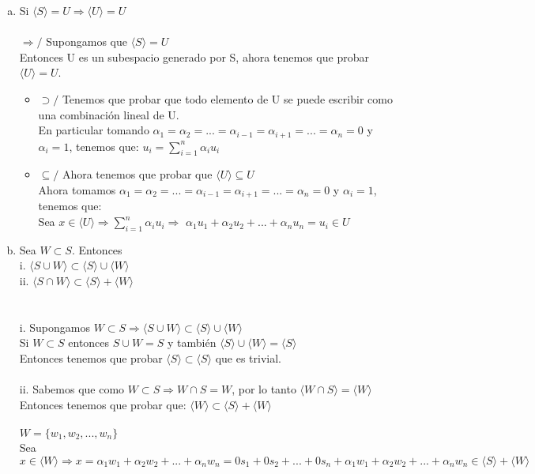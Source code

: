 \documentclass{article}
\begin{document}
\begin{enumerate}[a.]
	\item
		Si $\langle S\rangle = U \Longrightarrow \langle U\rangle = U$ \\ \\
		$\Rightarrow /$
		Supongamos que $\langle S \rangle = U$ \\
		Entonces U es un subespacio generado por S, ahora tenemos que probar $\langle U \rangle = U$.
		\begin{itemize}
			\item
				$\supset/$ Tenemos que probar que todo elemento de U se puede escribir como una
				combinación lineal de U. \\
				En particular tomando $\alpha_1 = \alpha_2 = ... = \alpha_{i-1} = \alpha_{i+1} = ...
				= \alpha_n = 0$ y $\alpha_i = 1$, tenemos que:
				$u_i = \displaystyle \sum_{i=1}^{n}{\alpha_i u_i}$
			\item
				$\subseteq/$
				Ahora tenemos que probar que $\langle U \rangle \subseteq U$ \\
				Ahora tomamos $\alpha_1 = \alpha_2 = ... = \alpha_{i-1} = \alpha_{i+1} = ... = \alpha_n = 0$ 
				y $\alpha_i = 1$, tenemos que: \\
				Sea $x \in \langle U\rangle \Rightarrow \sum_{i=1}^{n}{\alpha_i u_i} \Rightarrow$
				$\alpha_1 u_1 + \alpha_2 u_2 + ... + \alpha_n u_n = u_i \in U$
		\end{itemize}
	\item
		Sea $W \subset S$. Entonces \\
		i. $\langle S \cup W \rangle \subset \langle S \rangle \cup \langle W \rangle$ \\
		ii. $\langle S \cap W \rangle \subset \langle S \rangle + \langle W \rangle$ \\
		\\ \\
		i. Supongamos $W \subset S \Rightarrow \langle S \cup W\rangle \subset \langle S \rangle \cup \langle W \rangle$ \\
		Si $W \subset S$ entonces $S \cup W = S$ y también $\langle S \rangle \cup \langle W \rangle = \langle S \rangle$ \\
		Entonces tenemos que probar $\langle S \rangle \subset \langle S \rangle$ que es trivial.
		\\ \\
		ii. Sabemos que como $W \subset S \Rightarrow W \cap S = W$, por lo tanto $\langle W \cap S\rangle = \langle W \rangle$ \\
		Entonces tenemos que probar que: $\langle W \rangle \subset \langle S \rangle + \langle W \rangle$ \\ \\
		$W = \lbrace w_1,w_2,...,w_n\rbrace$ \\
		Sea $x \in \langle W \rangle \Rightarrow x = \alpha_1 w_1 + \alpha_2 w_2 + ... + 
		\alpha_n w_n = 0s_1+0s_2+...+0s_n + \alpha_1 w_1 + \alpha_2 w_2 + ... + \alpha_n w_n \in \langle S \rangle + \langle W \rangle$


\end{enumerate}
\end{document}
